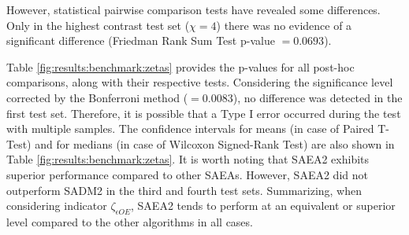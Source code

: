 			However, statistical pairwise comparison tests have revealed some differences. Only in the highest contrast test set ($\chi=4$) there was no evidence of a significant difference (Friedman Rank Sum Test p-value $= 0.0693$).
			
			Table \ref{fig:results:benchmark:zetas} provides the p-values for all post-hoc comparisons, along with their respective tests. Considering the significance level corrected by the Bonferroni method ($=0.0083$), no difference was detected in the first test set. Therefore, it is possible that a Type I error occurred during the test with multiple samples. The confidence intervals for means (in case of Paired T-Test) and for medians (in case of Wilcoxon Signed-Rank Test) are also shown in Table \ref{fig:results:benchmark:zetas}. It is worth noting that SAEA2 exhibits superior performance compared to other SAEAs. However, SAEA2 did not outperform SADM2 in the third and fourth test sets. Summarizing, when considering indicator $\zeta_{\epsilon OE}$, SAEA2 tends to perform at an equivalent or superior level compared to the other algorithms in all cases.
		
